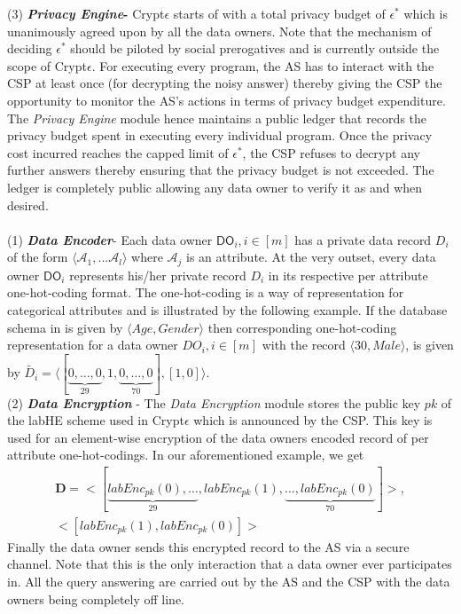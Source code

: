 (3)\textbf{\textit{ Privacy Engine}-} Crypt$\epsilon$ starts of with a total privacy budget of $\epsilon^*$ which is unanimously agreed upon by all the data owners. Note that the mechanism of deciding $\epsilon^*$ should be piloted by social prerogatives \cite{e1,e2} 
and is currently outside the scope of Crypt$\epsilon$. For executing every program, the \textsf{AS} has to interact with the \textsf{CSP} at least once (for decrypting the noisy answer) thereby giving the \textsf{CSP} the opportunity to monitor the \textsf{AS}'s actions in terms of privacy budget expenditure. The \textit{Privacy Engine} module hence maintains a public ledger that records the privacy budget spent in executing every individual program. Once the privacy cost incurred reaches the capped limit of $\epsilon^*$, the \textsf{CSP} refuses to decrypt any further answers thereby ensuring that the privacy budget is not exceeded.  The ledger is completely public allowing any data owner to verify it as and when desired.\\
\\
(1)\textbf{ \textit{Data Encoder}}-  Each data owner $\textsf{DO}_i, i \in [m]$ has a private data record $D_i$ of the form $\langle \mathcal{A}_1,...\mathcal{A}_l\rangle$ where $\mathcal{A}_j$ is an attribute. At the very outset, every data owner  $\textsf{DO}_i$ represents his/her private record $D_i$ in its respective per attribute one-hot-coding format. The one-hot-coding is a way of representation for categorical attributes and is illustrated by the following example. 
If the database schema in \system is given by  $\langle Age,Gender\rangle$ then corresponding one-hot-coding representation for a data owner $DO_i, i \in [m]$ with the record $\langle 30, Male\rangle$, is given by $\tilde{D_i}=\langle[\underbrace{0,\ldots,0}_{29},1,\underbrace{0,\ldots,0}_{70}],[1,0]\rangle$. \\
(2)\textbf{ \textit{Data Encryption}} - The \textit{Data Encryption} module stores the public key $pk$ of the labHE scheme used in Crypt$\epsilon$ which is announced by the CSP. This key is used for an element-wise encryption of the data owners encoded record of per attribute one-hot-codings. In our aforementioned example, we get \begin{gather*}\mathbf{D}=<[\underbrace{labEnc_{pk}(0),\ldots}_{29},labEnc_{pk}(1),\underbrace{\ldots,labEnc_{pk}(0)}_{70}]>,\\
<[labEnc_{pk}(1),labEnc_{pk}(0)]>\end{gather*} Finally the data owner sends this encrypted record to the AS via a secure channel. Note that this is the only interaction that a data owner ever participates in. All the query answering are carried out by the \textsf{AS} and the \textsf{CSP} with the data owners being completely off line.\\
